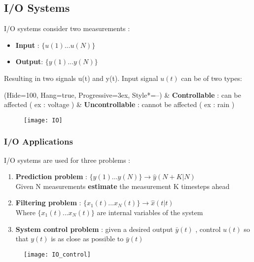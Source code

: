\subsection{I/O Systems} %
I/O systems consider two measurements : 
\begin{itemize}
\item \textbf{Input} : $\{ u(1) ... u(N) \} $
\item \textbf{Output}: $\{ y(1) ... y(N) \} $
\end{itemize}
Resulting in two signals u(t) and y(t). 
Input signal $ u(t) $ can be of two types: 
\begin{easylist}[itemize]
\ListProperties(Hide=100, Hang=true, Progressive=3ex, Style*=--)
& \textbf{Controllable} : can be affected ( ex : voltage )
& \textbf{Uncontrollable} : cannot be affected ( ex : rain )
\end{easylist}

\begin{figure}[!h]
  \centering
  \texttt{[image: IO]}
\end{figure}

\subsubsection{I/O Applications}
I/O systems are used for three problems : 
\begin{enumerate}
\item \textbf{Prediction problem} : $\{ y(1) ... y(N) \} \rightarrow \hat{y} (N+K|N)$ \\ Given N measurements \textbf{estimate} the measurement K timesteps ahead
\item \textbf{Filtering problem} : $\{ x_1(t) ... x_N(t) \} \rightarrow \hat{x} (t|t)$ \\Where $\{ x_1(t) ... x_N(t) \}$ are internal variables of the system
\item \textbf{System control problem} : given a desired output $ \bar{y}(t) $ , control $ u(t) $ so that $y(t)$ is as close as possible to  $ \bar{y}(t) $
\end{enumerate}

\begin{figure}[!h]
  \centering
  \texttt{[image: IO\_control]}
\end{figure}

